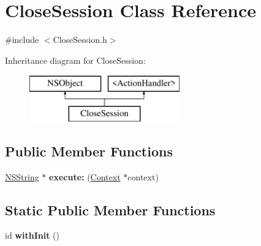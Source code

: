 \hypertarget{interface_close_session}{
\section{\-Close\-Session \-Class \-Reference}
\label{interface_close_session}
}


{\ttfamily \#include $<$\-Close\-Session.\-h$>$}

\-Inheritance diagram for \-Close\-Session\-:\begin{figure}[H]
\begin{center}
\leavevmode
\includegraphics[height=2.000000cm]{interface_close_session}
\end{center}
\end{figure}
\subsection*{\-Public \-Member \-Functions}
\begin{DoxyCompactItemize}
\item 
\hypertarget{interface_close_session_ac6c40d103f3887dcab388c34951937f7}{
\hyperlink{class_n_s_string}{\-N\-S\-String} $\ast$ {\bfseries execute\-:} (\hyperlink{interface_context}{\-Context} $\ast$context)}
\label{interface_close_session_ac6c40d103f3887dcab388c34951937f7}

\end{DoxyCompactItemize}
\subsection*{\-Static \-Public \-Member \-Functions}
\begin{DoxyCompactItemize}
\item 
\hypertarget{interface_close_session_a1201adc12995c1c02e3ceac7d88c5bc2}{
id {\bfseries with\-Init} ()}
\label{interface_close_session_a1201adc12995c1c02e3ceac7d88c5bc2}

\end{DoxyCompactItemize}


